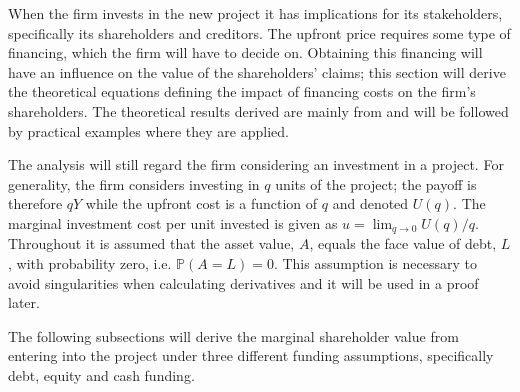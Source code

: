 \documentclass[main.tex]{subfiles}
\begin{document}
    When the firm invests in the new project it has implications for its stakeholders,
    specifically its shareholders and creditors.
    The upfront price requires some type of financing, 
    which the firm will have to decide on.
    Obtaining this financing will have an influence on the value of the shareholders' claims;
    this section will derive the theoretical equations defining
    the impact of financing costs on the firm's shareholders.
    The theoretical results derived are mainly from \textcite{ADS2019} 
    and will be followed by practical examples where they are applied.

    The analysis will still regard the firm considering an investment in a project.
    For generality, the firm considers investing in $q$ units of the project; 
    the payoff is therefore $qY$ while the upfront cost is a function of $q$ and denoted $U(q)$. 
    The marginal investment cost per unit invested is given as 
    $u = \lim_{q\rightarrow 0} U(q) / q$.
    Throughout it is assumed that the asset value, $A$, equals the face value of debt, $L$, 
    with probability zero, i.e. $\mathbb{P}\left(A = L\right) = 0$.
    This assumption is necessary to avoid singularities when calculating derivatives
    and it will be used in a proof later.

    The following subsections will derive the marginal shareholder value from entering into the project
    under three different funding assumptions, specifically debt, equity and cash funding.
\end{document}
